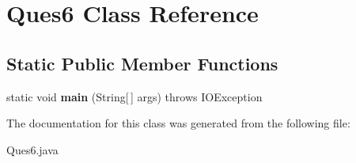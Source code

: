 \hypertarget{class_ques6}{}\section{Ques6 Class Reference}
\label{class_ques6}
\subsection*{Static Public Member Functions}
\begin{DoxyCompactItemize}
\item 
\mbox{\label{class_ques6_a891907b7676ab12071f65902a85875b0}} 
static void {\bfseries main} (String\mbox{[}$\,$\mbox{]} args)  throws I\+O\+Exception
\end{DoxyCompactItemize}


The documentation for this class was generated from the following file\+:\begin{DoxyCompactItemize}
\item 
Ques6.\+java\end{DoxyCompactItemize}
